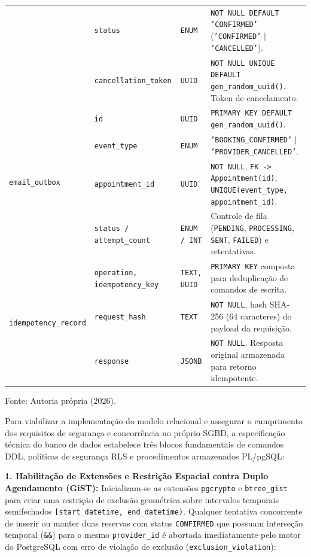 \documentclass[12pt,a4paper]{article}
\begin{document}
\begin{table}[hbt]
\begin{tabularx}{\textwidth}{|l|l|l|X|}
 & \texttt{status} & \texttt{ENUM} & \texttt{NOT NULL DEFAULT 'CONFIRMED'} (\texttt{'CONFIRMED'} $\mid$ \texttt{'CANCELLED'}). \\
 & \texttt{cancellation\_token} & \texttt{UUID} & \texttt{NOT NULL UNIQUE DEFAULT gen\_random\_uuid()}. Token de cancelamento. \\ \hline
\multirow{4}{*}{\texttt{email\_outbox}} 
 & \texttt{id} & \texttt{UUID} & \texttt{PRIMARY KEY DEFAULT gen\_random\_uuid()}. \\
 & \texttt{event\_type} & \texttt{ENUM} & \texttt{'BOOKING\_CONFIRMED'} $\mid$ \texttt{'PROVIDER\_CANCELLED'}. \\
 & \texttt{appointment\_id} & \texttt{UUID} & \texttt{NOT NULL}, \texttt{FK -> Appointment(id)}, \texttt{UNIQUE(event\_type, appointment\_id)}. \\
 & \texttt{status / attempt\_count} & \texttt{ENUM / INT} & Controle de fila (\texttt{PENDING}, \texttt{PROCESSING}, \texttt{SENT}, \texttt{FAILED}) e retentativas. \\ \hline
\multirow{3}{*}{\texttt{idempotency\_record}} 
 & \texttt{operation, idempotency\_key} & \texttt{TEXT, UUID} & \texttt{PRIMARY KEY} composta para deduplicação de comandos de escrita. \\
 & \texttt{request\_hash} & \texttt{TEXT} & \texttt{NOT NULL}, hash SHA-256 (64 caracteres) do payload da requisição. \\
 & \texttt{response} & \texttt{JSONB} & \texttt{NOT NULL}. Resposta original armazenada para retorno idempotente. \\ \hline
\end{tabularx}
\vspace{0.1cm}
{\footnotesize Fonte: Autoria própria (2026).}
\end{table}

Para viabilizar a implementação do modelo relacional e assegurar o cumprimento dos requisitos de segurança e concorrência no próprio SGBD, a especificação técnica do banco de dados estabelece três blocos fundamentais de comandos DDL, políticas de segurança RLS e procedimentos armazenados PL/pgSQL:

\noindent \textbf{1. Habilitação de Extensões e Restrição Espacial contra Duplo Agendamento (GiST):} Inicializam-se as extensões \texttt{pgcrypto} e \texttt{btree\_gist} para criar uma restrição de exclusão geométrica sobre intervalos temporais semifechados \texttt{[start\_datetime, end\_datetime)}. Qualquer tentativa concorrente de inserir ou manter duas reservas com status \texttt{CONFIRMED} que possuam interseção temporal (\texttt{\&\&}) para o mesmo \texttt{provider\_id} é abortada imediatamente pelo motor do PostgreSQL com erro de violação de exclusão (\texttt{exclusion\_violation}):
\end{document}
